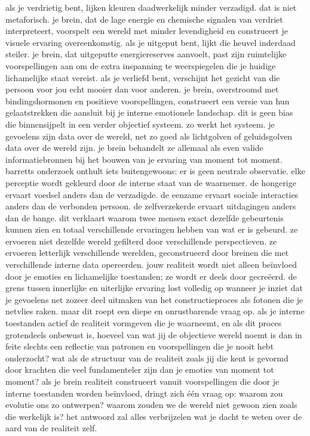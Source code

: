 als je verdrietig bent, lijken kleuren daadwerkelijk minder verzadigd. dat is niet metaforisch. je brein, dat de lage energie en chemische signalen van verdriet interpreteert, voorspelt een wereld met minder levendigheid en construeert je visuele ervaring overeenkomstig. als je uitgeput bent, lijkt die heuvel inderdaad steiler. je brein, dat uitgeputte energiereserves aanvoelt, past zijn ruimtelijke voorspellingen aan om de extra inspanning te weerspiegelen die je huidige lichamelijke staat vereist. als je verliefd bent, verschijnt het gezicht van die persoon voor jou echt mooier dan voor anderen. je brein, overstroomd met bindingshormonen en positieve voorspellingen, construeert een versie van hun gelaatstrekken die aansluit bij je interne emotionele landschap. dit is geen bias die binnensijpelt in een verder objectief systeem. zo werkt het systeem. je gevoelens zijn data over de wereld, net zo goed als lichtgolven of geluidsgolven data over de wereld zijn. je brein behandelt ze allemaal als even valide informatiebronnen bij het bouwen van je ervaring van moment tot moment. barretts onderzoek onthult iets buitengewoons: er is geen neutrale observatie. elke perceptie wordt gekleurd door de interne staat van de waarnemer. de hongerige ervaart voedsel anders dan de verzadigde. de eenzame ervaart sociale interacties anders dan de verbonden persoon. de zelfverzekerde ervaart uitdagingen anders dan de bange. dit verklaart waarom twee mensen exact dezelfde gebeurtenis kunnen zien en totaal verschillende ervaringen hebben van wat er is gebeurd. ze ervoeren niet dezelfde wereld gefilterd door verschillende perspectieven. ze ervoeren letterlijk verschillende werelden, geconstrueerd door breinen die met verschillende interne data opereerden. jouw realiteit wordt niet alleen beïnvloed door je emoties en lichamelijke toestanden; ze wordt er deels door gecreëerd. de grens tussen innerlijke en uiterlijke ervaring lost volledig op wanneer je inziet dat je gevoelens net zozeer deel uitmaken van het constructieproces als fotonen die je netvlies raken.
maar dit roept een diepe en onrustbarende vraag op. als je interne toestanden actief de realiteit vormgeven die je waarneemt, en als dit proces grotendeels onbewust is, hoeveel van wat jij de objectieve wereld noemt is dan in feite slechts een reflectie van patronen en voorspellingen die je nooit hebt onderzocht? wat als de structuur van de realiteit zoals jij die kent is gevormd door krachten die veel fundamenteler zijn dan je emoties van moment tot moment? als je brein realiteit construeert vanuit voorspellingen die door je interne toestanden worden beïnvloed, dringt zich één vraag op: waarom zou evolutie ons zo ontwerpen? waarom zouden we de wereld niet gewoon zien zoals die werkelijk is? het antwoord zal alles verbrijzelen wat je dacht te weten over de aard van de realiteit zelf.

